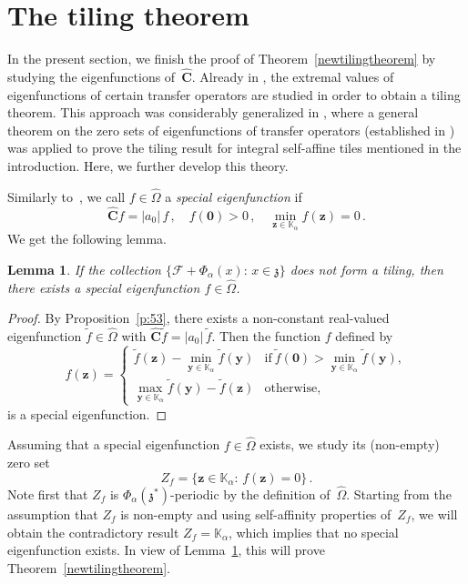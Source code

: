 \documentclass[12pt]{amsart}
\newtheorem{lemma}{Lemma}[section]
\theoremstyle{definition}
\theoremstyle{remark}
\numberwithin{equation}{section}
\begin{document}
\section{The tiling theorem} \label{sec:tilingcriterion}
In the present section, we finish the proof of Theorem~\ref{newtilingtheorem} by studying the eigenfunctions of~$\widehat{\mathbf{C}}$.
Already in \cite{Groechenig-Haas:94}, the extremal values of eigenfunctions of certain transfer operators are studied in order to obtain a tiling theorem.
This approach was considerably generalized in \cite{Lagarias-Wang:97}, where a general theorem on the zero sets of eigenfunctions of transfer operators (established in \cite{Cerveau-Conze-Raugi:96}) was applied to prove the tiling result for integral self-affine tiles mentioned in the introduction.
Here, we further develop this theory.

Similarly to~\cite{Lagarias-Wang:97}, we call $f \in \widehat\Omega$ a \emph{special eigenfunction} if
\[
\widehat{\mathbf{C}} f = |a_0|\, f\,, \quad f(\mathbf{0}) > 0\,, \quad \min_{\mathbf{z} \in \mathbb{K}_\alpha} f(\mathbf{z}) = 0\,.
\]
We get the following lemma.

\begin{lemma} \label{l:special}
If the collection $\{\mathcal{F} + \Phi_\alpha(x):\, x \in \mathfrak{z}\}$ does not form a tiling, then there exists a special eigenfunction $f \in \widehat\Omega$.
\end{lemma}

\begin{proof}
By Proposition~\ref{p:53}, there exists a non-constant real-valued eigenfunction $\tilde{f} \in \widehat\Omega$ with $\widehat{\mathbf{C}} \tilde{f} = |a_0|\, \tilde{f}$.
Then the function $f$ defined by
\[
f(\mathbf{z}) = \left\{\begin{array}{cl}\tilde{f}(\mathbf{z}) - \min_{\mathbf{y}\in\mathbb{K}_\alpha} \tilde{f}(\mathbf{y}) & \mbox{if}\ \tilde{f}(\mathbf{0}) > \min_{\mathbf{y}\in\mathbb{K}_\alpha} \tilde{f}(\mathbf{y}), \\[1ex] \max_{\mathbf{y}\in\mathbb{K}_\alpha} \tilde{f}(\mathbf{y}) - \tilde{f}(\mathbf{z}) & \mbox{otherwise,}\end{array}\right.
\]
is a special eigenfunction.
\end{proof}

Assuming that a special eigenfunction $f \in \widehat\Omega$ exists, we study its (non-empty) zero set
\[
Z_f = \big\{\mathbf{z} \in \mathbb{K}_\alpha:\, f(\mathbf{z}) = 0\big\}\,.
\]
Note first that $Z_f$ is $\Phi_\alpha(\mathfrak{z}^*)$-periodic by the definition of~$\widehat{\Omega}$.
Starting from the assumption that $Z_f$ is non-empty and using self-affinity properties of~$Z_f$, we will obtain the contradictory result $Z_f = \mathbb{K}_\alpha$, which implies that no special eigenfunction exists.
In view of Lemma~\ref{l:special}, this will prove Theorem~\ref{newtilingtheorem}.
\end{document}
